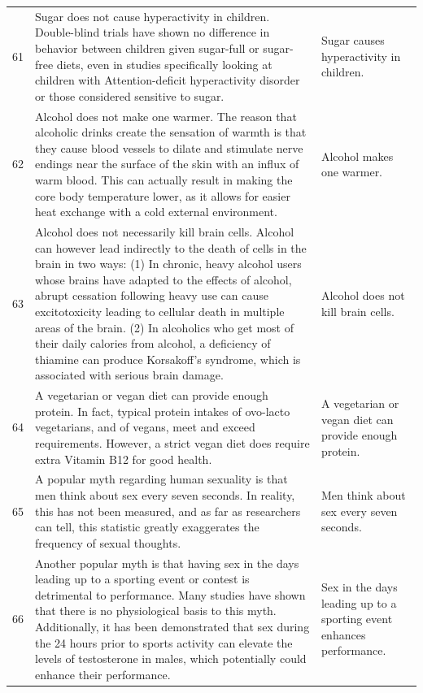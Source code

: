 \begin{tabular}{c|p{}|p{}}
61 & Sugar does not cause hyperactivity in children. Double-blind trials have shown no difference in behavior between children given sugar-full or sugar-free diets, even in studies specifically looking at children with Attention-deficit hyperactivity disorder or those considered sensitive to sugar. & Sugar causes hyperactivity in children. \\
62 & Alcohol does not make one warmer. The reason that alcoholic drinks create the sensation of warmth is that they cause blood vessels to dilate and stimulate nerve endings near the surface of the skin with an influx of warm blood. This can actually result in making the core body temperature lower, as it allows for easier heat exchange with a cold external environment. & Alcohol makes one warmer. \\
63 & Alcohol does not necessarily kill brain cells. Alcohol can however lead indirectly to the death of cells in the brain in two ways: (1) In chronic, heavy alcohol users whose brains have adapted to the effects of alcohol, abrupt cessation following heavy use can cause excitotoxicity leading to cellular death in multiple areas of the brain. (2) In alcoholics who get most of their daily calories from alcohol, a deficiency of thiamine can produce Korsakoff's syndrome, which is associated with serious brain damage. & Alcohol does not kill brain cells. \\
64 & A vegetarian or vegan diet can provide enough protein. In fact, typical protein intakes of ovo-lacto vegetarians, and of vegans, meet and exceed requirements. However, a strict vegan diet does require extra Vitamin B12 for good health. & A vegetarian or vegan diet can provide enough protein. \\
65 & A popular myth regarding human sexuality is that men think about sex every seven seconds. In reality, this has not been measured, and as far as researchers can tell, this statistic greatly exaggerates the frequency of sexual thoughts. & Men think about sex every seven seconds. \\
66 & Another popular myth is that having sex in the days leading up to a sporting event or contest is detrimental to performance. Many studies have shown that there is no physiological basis to this myth. Additionally, it has been demonstrated that sex during the 24 hours prior to sports activity can elevate the levels of testosterone in males, which potentially could enhance their performance. & Sex in the days leading up to a sporting event enhances performance. \\

\end{tabular}
